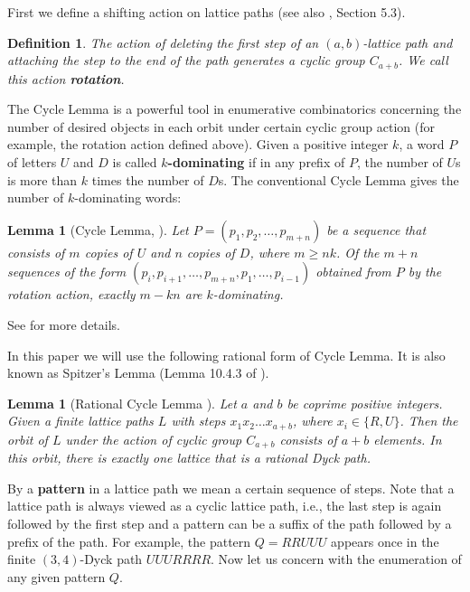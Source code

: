 \documentclass[a4paper,12pt]{article}
\newtheorem{defi}[thm]{Definition}
\newtheorem{lem}[thm]{Lemma}
\begin{document}
First we define a shifting action on lattice paths (see also \cite{EC2}, Section 5.3).

\begin{defi} \label{sab}
The action of deleting the first step of an $(a,b)$-lattice path  and attaching the step to the end of the path generates a cyclic group $C_{a+b}$. We call this action \textbf{rotation}.
\end{defi}

The Cycle Lemma is a powerful tool in enumerative combinatorics concerning the number of desired objects in each orbit under certain cyclic group action (for example, the rotation action defined above).  %
Given a positive integer $k$, a word $P$ of letters $U$ and $D$ is called \textbf{$k$-dominating} if in any prefix of $P$, the number of  $U$s is more than $k$ times the number of $D$s.
The conventional Cycle Lemma  gives the number of $k$-dominating words:
\begin{lem} [Cycle Lemma, \cite{CycleLemma}] {\label{OldCycleLemma}}
Let $P = (p_1,p_2,\ldots,p_{m+n})$ be a sequence that consists of  $m$ copies of  $U$ and $n$ copies of $D$, where $m\geq nk$. Of the $m+n$ sequences of the form $(p_i,p_{i+1},\ldots,p_{m+n},p_1,\ldots,p_{i-1})$ obtained from $P$ by the rotation action,  exactly $m-kn$ are $k$-dominating.
\end{lem}
See \cite{CycleLemma2}  for more details.

In this paper we will use the following rational form of Cycle Lemma. It is also known as Spitzer's Lemma (Lemma 10.4.3 of \cite{Bona}).

\begin{lem}[Rational Cycle Lemma ] \label{cycLemma}
Let $a$ and $b$ be coprime positive integers. Given a finite lattice paths $L$ with steps $x_1 x_2 \ldots x_{a+b}$, where $x_i\in \{R,U\}$. Then the orbit of $L$ under the action of cyclic group $C_{a+b}$ consists of $a+b$ elements. In this orbit, there is exactly one lattice that is a rational Dyck path.
\end{lem}


By a \textbf{pattern} in a lattice path we mean a certain sequence of steps. Note that a lattice  path is always viewed as a cyclic lattice path, i.e., the last step is again followed by the first step and a pattern can be a suffix of the path followed by a prefix of the path. For example, the pattern $Q=RRUUU$ appears once in the finite $(3,4)$-Dyck path $UUURRRR$. Now let us concern with the enumeration of any given pattern $Q$.
\end{document}
